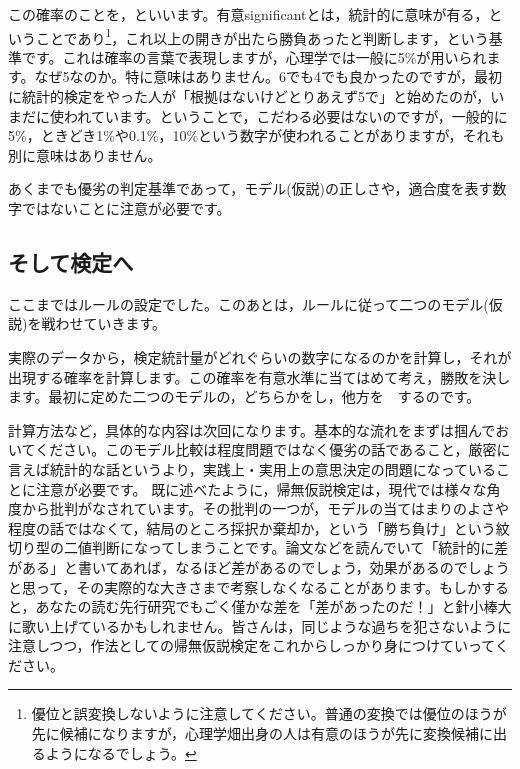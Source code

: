 \documentclass{ltjsbook}
\begin{document}
この確率のことを，といいます。有意significantとは，統計的に意味が有る，ということであり\footnote{優位と誤変換しないように注意してください。普通の変換では優位のほうが先に候補になりますが，心理学畑出身の人は有意のほうが先に変換候補に出るようになるでしょう。}，これ以上の開きが出たら勝負あったと判断します，という基準です。これは確率の言葉で表現しますが，心理学では一般に5\%が用いられます。なぜ5なのか。特に意味はありません。6でも4でも良かったのですが，最初に統計的検定をやった人が「根拠はないけどとりあえず5で」と始めたのが，いまだに使われています。ということで，こだわる必要はないのですが，一般的に5\%，ときどき1\%や0.1\%，10\%という数字が使われることがありますが，それも別に意味はありません。

あくまでも優劣の判定基準であって，モデル(仮説)の正しさや，適合度を表す数字ではないことに注意が必要です。

\subsection{そして検定へ}
ここまではルールの設定でした。このあとは，ルールに従って二つのモデル(仮説)を戦わせていきます。

実際のデータから，検定統計量がどれぐらいの数字になるのかを計算し，それが出現する確率を計算します。この確率を有意水準に当てはめて考え，勝敗を決します。最初に定めた二つのモデルの，どちらかをし，他方を　するのです。

計算方法など，具体的な内容は次回になります。基本的な流れをまずは掴んでおいてください。このモデル比較は程度問題ではなく優劣の話であること，厳密に言えば統計的な話というより，実践上・実用上の意思決定の問題になっていることに注意が必要です。
既に述べたように，帰無仮説検定は，現代では様々な角度から批判がなされています。その批判の一つが，モデルの当てはまりのよさや程度の話ではなくて，結局のところ採択か棄却か，という「勝ち負け」という紋切り型の二値判断になってしまうことです。論文などを読んでいて「統計的に差がある」と書いてあれば，なるほど差があるのでしょう，効果があるのでしょうと思って，その実際的な大きさまで考察しなくなることがあります。もしかすると，あなたの読む先行研究でもごく僅かな差を「差があったのだ！」と針小棒大に歌い上げているかもしれません。皆さんは，同じような過ちを犯さないように注意しつつ，作法としての帰無仮説検定をこれからしっかり身につけていってください。
\end{document}
